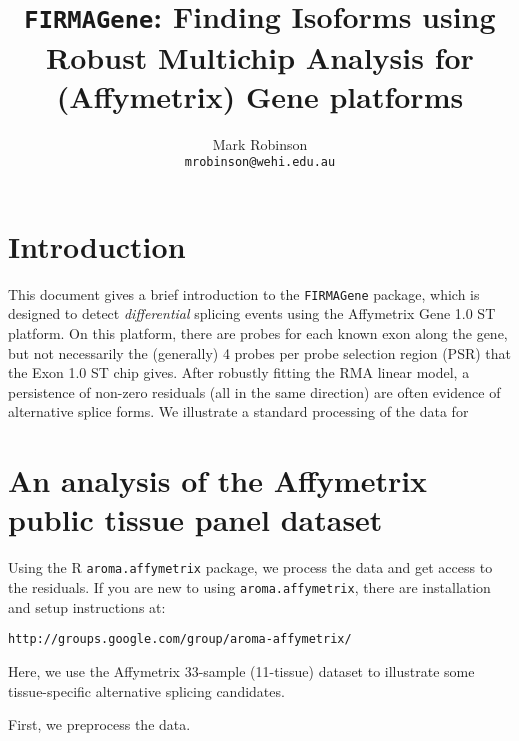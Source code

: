 \documentclass{article}
\begin{document}

\title{\texttt{FIRMAGene}: Finding Isoforms using Robust Multichip Analysis for (Affymetrix) Gene platforms}
\author{Mark Robinson \\ \texttt{mrobinson@wehi.edu.au}}
\maketitle

\section{Introduction}

\noindent This document gives a brief introduction to the \texttt{FIRMAGene} package, which is designed to detect {\em differential} splicing events using the Affymetrix Gene 1.0 ST platform.  On this platform, there are probes for each known exon along the gene, but not necessarily the (generally) 4 probes per probe selection region (PSR) that the Exon 1.0 ST chip gives.  After robustly fitting the RMA linear model, a persistence of non-zero residuals (all in the same direction) are often evidence of alternative splice forms.  We illustrate a standard processing of the data for 

\section{An analysis of the Affymetrix public tissue panel dataset}

Using the R \texttt{aroma.affymetrix} package, we process the data and get access to the residuals.  If you are new to using \texttt{aroma.affymetrix}, there are installation and setup instructions at:

\texttt{http://groups.google.com/group/aroma-affymetrix/}

Here, we use the Affymetrix 33-sample (11-tissue) dataset to illustrate some tissue-specific alternative splicing candidates.

First, we preprocess the data.
\end{document}
